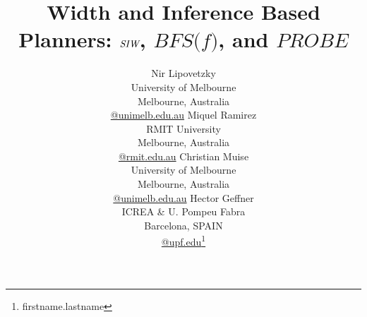 \documentclass[letterpaper]{article}
\begin{document}
\title{Width and Inference Based Planners: $\SR$, $\textit{BFS(f)}$, and $\textit{PROBE}$}


\author{Nir Lipovetzky \\
      University of Melbourne \\
   Melbourne, Australia\\ 
   {\normalsize\url{@unimelb.edu.au}}
   \And
   Miquel Ramirez \\
   RMIT University \\
   Melbourne, Australia\\ 
   {\normalsize\url{@rmit.edu.au}}
   \And
   Christian Muise \\
   University of Melbourne \\
   Melbourne, Australia\\ 
   {\normalsize\url{@unimelb.edu.au}}
   \And
        Hector Geffner \\
        ICREA \&  U. Pompeu Fabra \\
        Barcelona, SPAIN \\
        {\normalsize\url{@upf.edu}}\thanks{firstname.lastname}
}




\newcommand{\tuple}[1]{{\langle #1\rangle}}
\newcommand{\triple}[1]{{\langle #1\rangle}}
\newcommand{\pair}[1]{{\langle #1\rangle}}

\newcommand{\Omit}[1]{}

\newcommand{\OmitEcai}[1]{}

\newcommand{\eqdef}{\stackrel{\hbox{\tiny{def}}}{=}}
\newcommand{\IR}{{\textit{IW}}}
\newcommand{\SR}{{\textit{SIW}}}
\newcommand{\ID}{{\textit{ID}}}

\newcommand{\BRFS}{{\textit{BrFS}}}

 \newtheorem{theorem}{Theorem}


\newtheorem{proposition}[theorem]{Proposition}
\newtheorem{lemma}[theorem]{Lemma}
\newtheorem{corollary}[theorem]{Corollary}
\newtheorem{definition}[theorem]{Definition}



\maketitle
\end{document}
